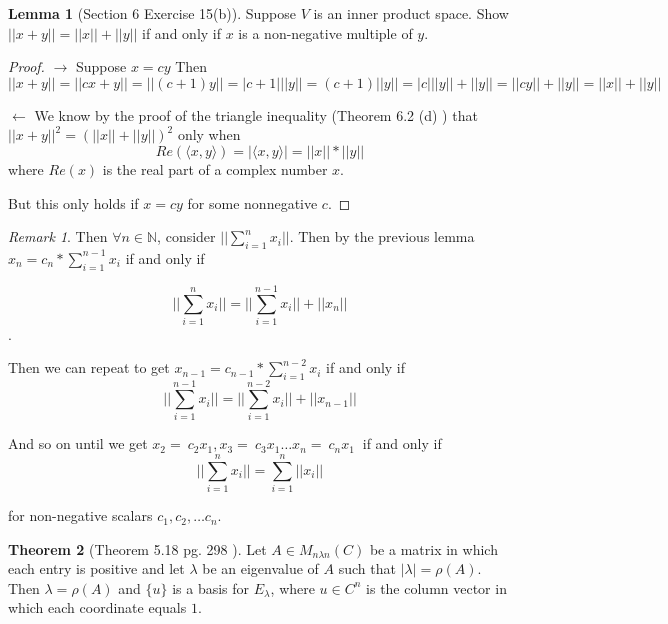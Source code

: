 \documentclass{amsart}
\theoremstyle{definition}
\newtheorem{theorem}{Theorem}
\newtheorem{lemma}[theorem]{Lemma}
\theoremstyle{remark}
\newtheorem{remark}[thm]{Remark}
\numberwithin{equation}{section}
\begin{document}

\begin{lemma}[Section 6 Exercise 15(b)]
Suppose $V$ is an inner product space.
Show $|| x + y|| = || x|| + ||y||$ if and only if $x$ is a non-negative multiple of $y$.
\end{lemma}

\begin{proof}
$\rightarrow$ Suppose $x = cy$
Then $$|| x  + y|| = ||cx + y|| = || (c +1) y|| = |c + 1| ||y|| = (c + 1) ||y|| =  |c| ||y|| + ||y|| = ||cy || + ||y|| = ||x|| + ||y||$$


$\leftarrow$ We know by the proof of the triangle inequality (Theorem 6.2 (d) \cite{friedberg2003linear}) that $||x+y||^2 = (||x|| + ||y||)^2$ only when 
$$Re(\langle x, y \rangle) = |\langle x, y \rangle| = ||x|| * ||y||$$
where $Re(x)$ is the real part of a complex number $x$.

But this only holds if $x = cy$ for some nonnegative $c$.


\end{proof}

\begin{remark}
Then $\forall n \in \mathbb{N}$, consider $||\sum_{i=1}^n x_i||$.
Then by the previous lemma $x_n = c_n* \sum_{i = 1}^{n-1} x_i$ if and only if

$$||\sum_{i = 1}^n x_i|| = ||\sum_{i = 1}^{n-1} x_i|| + ||x_n||$$.

Then we can repeat to get $x_{n-1} = c_{n-1}  * \sum_{i = 1}^{n-2} x_i$ if and only if $$ ||\sum_{i = 1}^{n-1} x_i|| =  ||\sum_{i = 1}^{n-2} x_i|| + ||x_{n-1}||  $$

And so on until we get $x_2 =\ c_2x_1 , x_3 =\ c_3x_1 \ldots x_n =\ c_nx_1\ $ if and only if  $$||\sum_{i = 1}^n x_i|| = \sum_{i = 1}^{n} ||x_i||$$ 

for non-negative scalars $c_1, c_2, \ldots c_n$.

\end{remark}


\begin{theorem}[Theorem 5.18 pg. 298 \cite{friedberg2003linear}]\label{theorem518}
Let $A \in M_{n \lambda n} (C)$ be a matrix in which each entry is positive and let $\lambda$ be an eigenvalue of $A$ such that $| \lambda | = \rho(A)$.
Then $\lambda = \rho(A)$ and $\{ u \}$ is a basis for $E_{\lambda}$, where $u \in C^n$ is the column vector in which each coordinate equals $1$.

\end{theorem}
\end{document}
